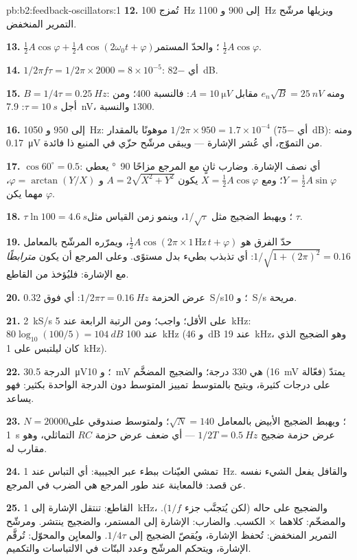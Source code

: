 \begin{solution}{pb:b2:feedback-oscillators:1}
\textbf{12.} تُمزج \qty{100}{Hz} إلى $900$ و \qty{1100}{Hz} ويزيلها
مرشّح التمرير المنخفض.

\textbf{13.} $\tfrac12A\cos\varphi + \tfrac12A\cos(2\omega_0t + \varphi)$؛ والحدّ المستمر $\tfrac12A\cos\varphi$.

\textbf{14.} $1/2\pi f\tau = 1/2\pi \times 2000 = 8 \times 10^{-5}$: أي \qty{-82}{dB}.

\textbf{15.} $B = 1/4\tau = \qty{0.25}{Hz}$: ومنه $e_n\sqrt B = \qty{25}{nV}$ مقابل $A =
\qty{10}{\micro V}$: فالنسبة $400$؛ ومن أجل $\tau = \qty{10}{s}$: \qty{7.9}{nV}، والنسبة $1300$.

\textbf{16.} إلى $950$ و \qty{1050}{Hz}: موهونًا بالمقدار $1/2\pi \times 950 = 1.7 \times
10^{-4}$ (أي \qty{-75}{dB}): ومنه \qty{0.17}{\micro V} من التموّج، أي عُشر الإشارة ---
ويبقى مرشّح حزّي في المنبع ذا فائدة.

\textbf{17.} $\cos60^\circ = 0.5$: أي نصف الإشارة. وضارب ثانٍ مع
المرجع مزاحًا \qty{90}{\degree} يعطي $Y = \tfrac12A\sin\varphi$؛ ومع $X =
\tfrac12A\cos\varphi$ يكون $A = 2\sqrt{X^2 + Y^2}$ و $\varphi = \arctan(Y/X)$، مهما يكن $\varphi$.

\textbf{18.} $\tau\ln100 = \qty{4.6}{s}$؛ ويهبط الضجيج مثل $1/\sqrt\tau$، وينمو
زمن القياس مثل $\tau$.

\textbf{19.} حدّ الفرق هو $\tfrac12A\cos(2\pi \times 1\,\text{Hz}\,t + \varphi)$،
ويمرّره المرشّح بالمعامل $1/\sqrt{1 + (2\pi)^2} = 0.16$: أي تذبذب بطيء
بدل مستوًى. وعلى المرجع أن يكون \emph{مترابطًا}
مع الإشارة: فليُؤخذ من القاطع.

\textbf{20.} عرض الحزمة $1/2\pi\tau = \qty{0.16}{Hz}$: أي فوق \qty{0.32}{S/s}؛
و \qty{10}{S/s} مريحة.

\textbf{21.} \qty{2}{kS/s} على الأقل؛  واجب؛
ومن الرتبة الرابعة عند \qty{5}{kHz}: $80\log_{10}(100/5) = \qty{104}{dB}$ عند \qty{100}{kHz}
(و \qty{46}{dB} عند \qty{19}{kHz}، وهو الضجيج الذي كان ليلتبس على \qty{1}{kHz}).

\textbf{22.} الدرجة \qty{30.5}{\micro V}؛ و \qty{10}{mV} هي $330$ درجة؛ والضجيج
المضخَّم (\qty{16}{mV} فعّالة) يمتدّ على درجات كثيرة، ويتيح بالمتوسط تمييز
المتوسط دون الدرجة الواحدة بكثير: فهو يساعد.

\textbf{23.} $N = 20000$؛ ويهبط الضجيج الأبيض بالمعامل $\sqrt N = 140$؛
ولمتوسط صندوقي على \qty{1}{s} عرض حزمة ضجيج $1/2T = \qty{0.5}{Hz}$ --- أي ضعف
عرض حزمة $RC$ التماثلي، وهو مقارب له.

\textbf{24.} تمشي العيّنات ببطء عبر الجيبية: أي التباس عند \qty{1}{Hz}.
والقافل يفعل الشيء نفسه عن قصد: فالمعاينة عند طور المرجع
هي الضرب في المرجع.

\textbf{25.} القاطع: تنتقل الإشارة إلى \qty{1}{kHz}، والضجيج على حاله (لكن
يُتجنَّب جزء $1/f$). والمضخّم: كلاهما $\times$ الكسب. والضارب: الإشارة
إلى المستمر، والضجيج ينتشر. ومرشّح التمرير المنخفض: تُحفظ الإشارة، ويُقصّ الضجيج إلى $1/4\tau$.
والمعايِن والمحوّل: تُرقَّم الإشارة، ويتحكم المرشّح وعدد البتّات
في الالتباسات والتكميم.
\end{solution}
